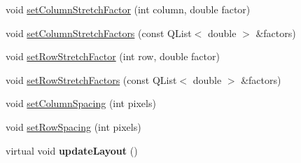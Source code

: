 \begin{DoxyCompactItemize}
\item 
void \hyperlink{classQCPLayoutGrid_ae38f31a71687b9d7ee3104852528fb50}{set\+Column\+Stretch\+Factor} (int column, double factor)
\item 
void \hyperlink{classQCPLayoutGrid_a6c2591d1a7e2534ce036989543b49e57}{set\+Column\+Stretch\+Factors} (const Q\+List$<$ double $>$ \&factors)
\item 
void \hyperlink{classQCPLayoutGrid_a7b0273de5369bd93d942edbaf5b166ec}{set\+Row\+Stretch\+Factor} (int row, double factor)
\item 
void \hyperlink{classQCPLayoutGrid_a200b45f9c908f96ebadaa3c8d87a2782}{set\+Row\+Stretch\+Factors} (const Q\+List$<$ double $>$ \&factors)
\item 
void \hyperlink{classQCPLayoutGrid_a3a49272aba32bb0fddc3bb2a45a3dba0}{set\+Column\+Spacing} (int pixels)
\item 
void \hyperlink{classQCPLayoutGrid_aaef2cd2d456197ee06a208793678e436}{set\+Row\+Spacing} (int pixels)
\item 
virtual void {\bfseries update\+Layout} ()\hypertarget{classQCPLayoutGrid_a07f8dd7d3d61d7345026621d446042a4}{}\label{classQCPLayoutGrid_a07f8dd7d3d61d7345026621d446042a4}


\end{DoxyCompactItemize}
